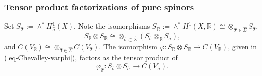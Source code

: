 \documentclass[12pt]{amsart}
\newcommand{\hide}[1]{}
\numberwithin{equation}{subsection}
\theoremstyle{plain}
\theoremstyle{definition}
\newtheorem{rem}[thm]{Remark}
\newcommand{\QQ}{{\mathbb Q}}
\newcommand{\RR}{{\mathbb R}}
\newcommand{\Spin}{{\rm Spin}}
\begin{document}
{%

\hide{
In other words, $\Spin(V)_{\hat{\eta}}$ is isomorphic to the subgroup of 
$\Spin(H^1_{\hat{\sigma}}(X)\oplus H^1_{\hat{\sigma}}(\hat{X}))$ preserving the lattice $V$, where $V_{\hat{\sigma}}:=H^1_{\hat{\sigma}}(X)\oplus H^1_{\hat{\sigma}}(\hat{X})$ is endowed with the obvious $\RR$-bilinear symmetric pairing. The composition 
\[
V_\QQ\rightarrow V_\QQ\otimes_\QQ F \rightarrow V_{\hat{\sigma}},
\]
of the inclusion with the projection onto the eigenspace,
should be (??? define the righthand side as a $\QQ$-vector space ???) a $\QQ$-linear isomorphism of  vector spaces 
such that the bilinear pairing on $V_\QQ$ is the composition of the $F$-bilinear (???) pairing on the right hand side with $tr_{F/\QQ}:F\rightarrow \QQ$. 
}



% 
\subsubsection{Tensor product factorizations of pure spinors}
Set $S_{\hat{\sigma}}:=\wedge^*H^1_{\hat{\sigma}}(X)$. 
Note the isomorphisms $S_\RR:=\wedge^*H^1(X,\RR)\cong\otimes_{\hat{\sigma}\in \hat{\Sigma}}S_{\hat{\sigma}}$,
\[
S_\RR\otimes S_\RR\cong \otimes_{\hat{\sigma}\in \hat{\Sigma}}(S_{\hat{\sigma}}\otimes_\RR S_{\hat{\sigma}}),
\]
and $C(V_\RR)\cong \otimes_{\hat{\sigma}\in\hat{\Sigma}}C(V_{\hat{\sigma}})$. 
The isomorphism $\varphi:S_\RR\otimes S_\RR\rightarrow C(V_\RR)$, given in (\ref{eq-Chevalley-varphi}),  factors as the tensor product of 
\[
\varphi_{\hat{\sigma}}:S_{\hat{\sigma}}\otimes S_{\hat{\sigma}}\rightarrow %
C(V_{\hat{\sigma}}).
\] 

}
\end{document}
